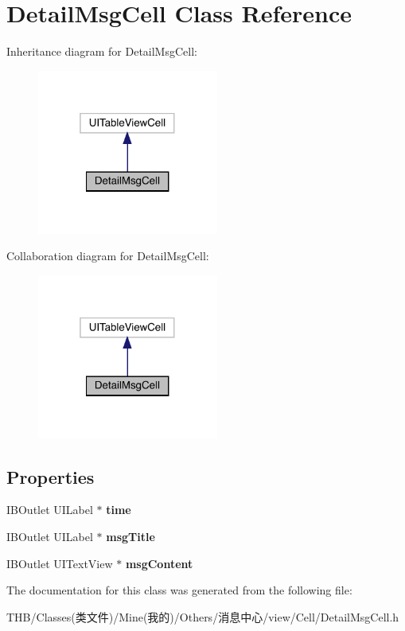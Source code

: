 \hypertarget{interface_detail_msg_cell}{}\section{Detail\+Msg\+Cell Class Reference}
\label{interface_detail_msg_cell}


Inheritance diagram for Detail\+Msg\+Cell\+:\nopagebreak
\begin{figure}[H]
\begin{center}
\leavevmode
\includegraphics[width=169pt]{interface_detail_msg_cell__inherit__graph}
\end{center}
\end{figure}


Collaboration diagram for Detail\+Msg\+Cell\+:\nopagebreak
\begin{figure}[H]
\begin{center}
\leavevmode
\includegraphics[width=169pt]{interface_detail_msg_cell__coll__graph}
\end{center}
\end{figure}
\subsection*{Properties}
\begin{DoxyCompactItemize}
\item 
\mbox{\label{interface_detail_msg_cell_a47fb6b38db1cf807ed3a984e06004821}} 
I\+B\+Outlet U\+I\+Label $\ast$ {\bfseries time}
\item 
\mbox{\label{interface_detail_msg_cell_ae5654f5b7951a3b6c3faebe787390576}} 
I\+B\+Outlet U\+I\+Label $\ast$ {\bfseries msg\+Title}
\item 
\mbox{\label{interface_detail_msg_cell_a3a7ef4cc3804ba73229c23a95d0472f0}} 
I\+B\+Outlet U\+I\+Text\+View $\ast$ {\bfseries msg\+Content}
\end{DoxyCompactItemize}


The documentation for this class was generated from the following file\+:\begin{DoxyCompactItemize}
\item 
T\+H\+B/\+Classes(类文件)/\+Mine(我的)/\+Others/消息中心/view/\+Cell/Detail\+Msg\+Cell.\+h\end{DoxyCompactItemize}
